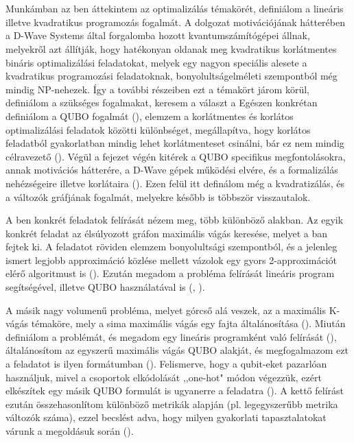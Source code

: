 

\chapter{\bevezetes}

Munkámban az ben áttekintem az optimalizálás témakörét, definiálom a lineáris illetve kvadratikus programozás fogalmát.
A dolgozat motivációjának hátterében a D-Wave Systems által forgalomba hozott kvantumszámítógépei állnak, melyekről azt állítják, hogy hatékonyan oldanak meg kvadratikus korlátmentes bináris optimalizálási feladatokat, melyek egy nagyon speciális alesete a kvadratikus programozási feladatoknak, bonyolultságelméleti szempontból még mindig NP-nehezek. Így a  további részeiben ezt a témakört járom körül, definiálom a szükséges fogalmakat, keresem a választ a 
Egészen konkrétan definiálom a QUBO fogalmát (), elemzem a korlátmentes és korlátos optimalizálási feladatok közötti különbséget, megállapítva, hogy korlátos feladatból gyakorlatban mindig lehet korlátmenteset csinálni, bár ez nem mindig célravezető ().
Végül a fejezet végén kitérek a QUBO specifikus megfontolásokra, annak motivációs hátterére, a D-Wave gépek működési elvére, és a formalizálás nehézségeire illetve korlátaira (). Ezen felül itt definálom még a kvadratizálás, és a változók gráfjának fogalmát, melyekre később is többször visszautalok.

 
A ben konkrét feladatok felírását nézem meg, több különböző alakban. Az egyik konkrét feladat az élsúlyozott gráfon maximális vágás keresése, melyet a ban fejtek ki. A feladatot röviden elemzem bonyolultsági szempontból, és a jelenleg ismert legjobb approximáció közlése mellett vázolok egy gyors 2-approximációt elérő algoritmust is ().
Ezután megadom a probléma felírását lineáris program segítségével, illetve QUBO használatával is (, ).

A másik nagy volumenű probléma, melyet górcső alá veszek, az a maximális K-vágás témaköre, mely a sima maximális vágás egy fajta általánosítása (). Miután definiálom a problémát, és megadom egy lineáris programként való felírását (), általánosítom az egyszerű maximális vágás QUBO alakját, és megfogalmazom ezt a feladatot is ilyen formátumban (). Felismerve, hogy a qubit-eket pazarlóan használjuk, mivel a csoportok elkódolását ,,one-hot" módon végezzük, ezért elkészítek egy másik QUBO formulát is ugyanerre a feladatra (). A kettő felírást ezután összehasonlítom különböző metrikák alapján (pl. legegyszerűbb metrika változók száma), ezzel becslést adva, hogy milyen gyakorlati tapasztalatokat várunk a megoldásuk során ().

